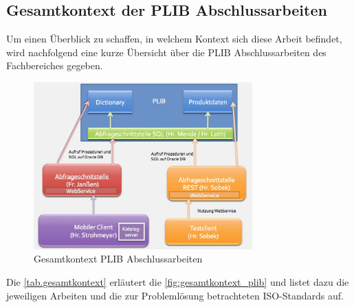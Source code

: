 \subsection{Gesamtkontext der PLIB Abschlussarbeiten}

Um einen Überblick zu schaffen, in welchem Kontext sich diese Arbeit befindet, wird nachfolgend eine kurze Übersicht über die PLIB Abschlussarbeiten des Fachbereiches gegeben.

\begin{figure}[htbp]
	\centering
		\includegraphics[width=0.75\textwidth]{images/gesamtkontext_plib.jpg}
	\caption{Gesamtkontext PLIB Abschlussarbeiten}
	\label{fig:gesamtkontext_plib}
\end{figure}

Die \autoref{tab.gesamtkontext} erläutert die \autoref{fig:gesamtkontext_plib} und listet dazu die jeweiligen Arbeiten und die zur Problemlösung betrachteten ISO-Standards auf.

